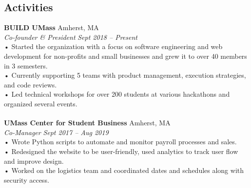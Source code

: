\documentclass[margin,line]{resume}
\begin{document}
\begin{resume}
    
    
    \section{\mysidestyle Activities}

    \textbf{BUILD UMass} \hfill Amherst, MA
    \\
    \textsl{Co-founder \& President} \hfill \textsl{Sept 2018 -- Present}
    \\
    •	Started the organization with a focus on software engineering and web development for non-profits and small businesses and grew it to over 40 members in 3 semesters.
    \\
    •	Currently supporting 5 teams with product management, execution strategies, and code reviews.
    \\
    •	Led technical workshops for over 200 students at various hackathons and organized several events.
    \\ \vspace{-1.5mm} \\
    \textbf{UMass Center for Student Business} \hfill Amherst, MA
    \\
    \textsl{Co-Manager} \hfill \textsl{Sept 2017 -- Aug 2019}
    \\
    •	Wrote Python scripts to automate and monitor payroll processes and sales.
    \\
    •	Redesigned the website to be user-friendly, used analytics to track user flow and improve design.
    \\
    •	Worked on the logistics team and coordinated dates and schedules along with security access.


\end{resume}
\end{document}
